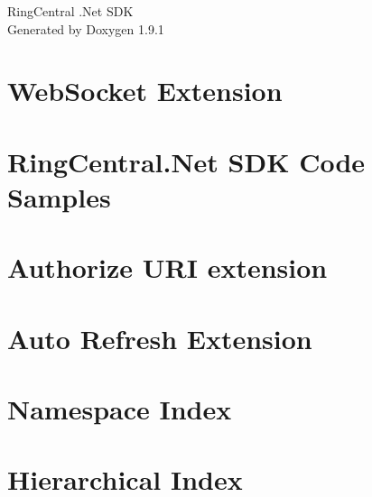 \let\mypdfximage\pdfximage\def\pdfximage{\immediate\mypdfximage}\documentclass[twoside]{book}
\newcommand{\+}{\discretionary{\mbox{\scriptsize$\hookleftarrow$}}{}{}}
\newcommand{\clearemptydoublepage}{%
  \newpage{\pagestyle{empty}\cleardoublepage}%
}
\begin{document}
\raggedbottom

\hypersetup{pageanchor=false,
             bookmarksnumbered=true,
             pdfencoding=unicode
            }
\begin{titlepage}
\vspace*{7cm}
\begin{center}%
{\Large Ring\+Central .Net SDK }\\
\vspace*{1cm}
{\large Generated by Doxygen 1.9.1}\\
\end{center}
\end{titlepage}
\clearemptydoublepage
{}
\tableofcontents
\clearemptydoublepage
{}
\hypersetup{pageanchor=true}

\chapter{Web\+Socket Extension}
\label{md_RingCentral_Net_WebSocket_README}

\chapter{Ring\+Central.\+Net SDK Code Samples}
\label{md_RingCentral_Net_samples}

\chapter{Authorize URI extension}
\label{md_RingCentral_Net_AuthorizeUri_README}

\chapter{Auto Refresh Extension}
\label{md_RingCentral_Net_AutoRefresh_README}

\chapter{Namespace Index}

\chapter{Hierarchical Index}

\end{document}
